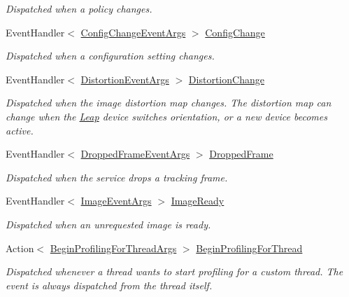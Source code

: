 \begin{DoxyCompactItemize}
\begin{DoxyCompactList}\small\item\em Dispatched when a policy changes. \end{DoxyCompactList}\item 
Event\+Handler$<$ \mbox{\hyperlink{class_leap_1_1_config_change_event_args}{Config\+Change\+Event\+Args}} $>$ \mbox{\hyperlink{class_leap_1_1_controller_aa95b8d42774232245cd10c23d90d0343}{Config\+Change}}
\begin{DoxyCompactList}\small\item\em Dispatched when a configuration setting changes. \end{DoxyCompactList}\item 
Event\+Handler$<$ \mbox{\hyperlink{class_leap_1_1_distortion_event_args}{Distortion\+Event\+Args}} $>$ \mbox{\hyperlink{class_leap_1_1_controller_a3a00d190090f618416c578d8615e4921}{Distortion\+Change}}
\begin{DoxyCompactList}\small\item\em Dispatched when the image distortion map changes. The distortion map can change when the \mbox{\hyperlink{namespace_leap}{Leap}} device switches orientation, or a new device becomes active. \end{DoxyCompactList}\item 
Event\+Handler$<$ \mbox{\hyperlink{class_leap_1_1_dropped_frame_event_args}{Dropped\+Frame\+Event\+Args}} $>$ \mbox{\hyperlink{class_leap_1_1_controller_ac9829d338d232ab7b09e59fadf2d24c5}{Dropped\+Frame}}
\begin{DoxyCompactList}\small\item\em Dispatched when the service drops a tracking frame. \end{DoxyCompactList}\item 
Event\+Handler$<$ \mbox{\hyperlink{class_leap_1_1_image_event_args}{Image\+Event\+Args}} $>$ \mbox{\hyperlink{class_leap_1_1_controller_ad76a140483ce708520eb0e940c345a1f}{Image\+Ready}}
\begin{DoxyCompactList}\small\item\em Dispatched when an unrequested image is ready. \end{DoxyCompactList}\item 
Action$<$ \mbox{\hyperlink{struct_leap_1_1_begin_profiling_for_thread_args}{Begin\+Profiling\+For\+Thread\+Args}} $>$ \mbox{\hyperlink{class_leap_1_1_controller_a483c1f8ff0a5557ee0a609bfe242f01c}{Begin\+Profiling\+For\+Thread}}
\begin{DoxyCompactList}\small\item\em Dispatched whenever a thread wants to start profiling for a custom thread. The event is always dispatched from the thread itself. \end{DoxyCompactList}\item 

\end{DoxyCompactItemize}
